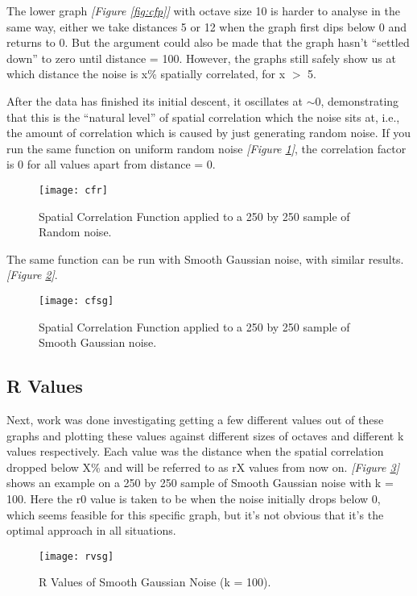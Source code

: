\documentclass[11pt,a4paper]{article}
\begin{document}
The lower graph \emph{[Figure \ref{fig:cfp}]} with octave size 10 is harder to analyse in the same way, either we take distances 5 or 12 when the graph first dips below 0 and returns to 0. But the argument could also be made that the graph hasn’t “settled down” to zero until distance = 100. However, the graphs still safely show us at which distance the noise is x\% spatially correlated, for x $>$ 5. 

After the data has finished its initial descent, it oscillates at $\sim$0, demonstrating that this is the “natural level” of spatial correlation which the noise sits at, i.e., the amount of correlation which is caused by just generating random noise. If you run the same function on uniform random noise \emph{[Figure \ref{fig:cfr}]}, the correlation factor is 0 for all values apart from distance = 0.

\begin{figure}[h]
	\centering
	\texttt{[image: cfr]}
	\caption{Spatial Correlation Function applied to a 250 by 250 sample of Random noise.}
	\label{fig:cfr}
\end{figure}

The same function can be run with Smooth Gaussian noise, with similar results. \emph{[Figure \ref{fig:cfsg}]}.

\begin{figure}[h]
	\centering
	\texttt{[image: cfsg]}
	\caption{Spatial Correlation Function applied to a 250 by 250 sample of Smooth Gaussian noise.}
	\label{fig:cfsg}
\end{figure}

\subsection{R Values}

Next, work was done investigating getting a few different values out of these graphs and plotting these values against different sizes of octaves and different k values respectively. Each value was the distance when the spatial correlation dropped below X\% and will be referred to as rX values from now on. \emph{[Figure \ref{fig:rvsg}]} shows an example on a 250 by 250 sample of Smooth Gaussian noise with k = 100. Here the r0 value is taken to be when the noise initially drops below 0, which seems feasible for this specific graph, but it’s not obvious that it’s the optimal approach in all situations.

\begin{figure}[h]
	\centering
	\texttt{[image: rvsg]}
	\caption{R Values of Smooth Gaussian Noise (k = 100).}
	\label{fig:rvsg}
\end{figure}
\end{document}
